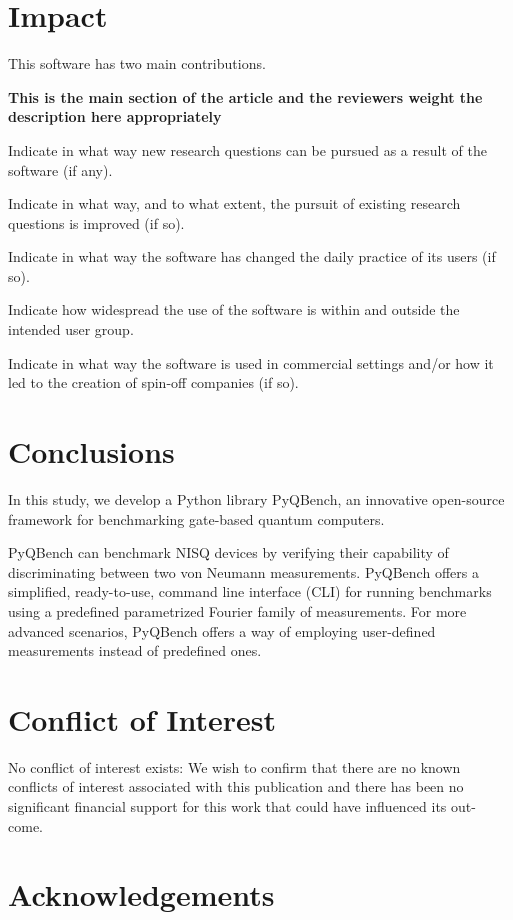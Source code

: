 \documentclass[preprint,12pt, a4paper, dvipsnames]{elsarticle}
\newcommand{\1}{{\rm 1\hspace{-0.9mm}l}}
\begin{document}
\section{Impact}
This software has two main contributions.



\textbf{This is the main section of the article and the reviewers weight the
description here appropriately}

Indicate in what way new research questions can be pursued as a result of the
software (if any).

Indicate in what way, and to what extent, the pursuit of existing research
questions is improved (if so).

Indicate in what way the software has changed the daily practice of its users
(if so).

Indicate how widespread the use of the software is within and outside the
intended user group.

Indicate in what way the software is used in commercial settings and/or how it
led to the creation of spin-off companies (if so).

\section{Conclusions}
\label{}

In this study, we develop  a Python library PyQBench, an innovative open-source framework for benchmarking
gate-based quantum computers.


PyQBench can benchmark NISQ devices by verifying their capability of
discriminating between two von Neumann measurements. PyQBench offers a simplified, ready-to-use,
command line interface (CLI) for running benchmarks using a predefined parametrized Fourier
family of measurements. For more advanced scenarios, PyQBench offers a way of employing user-defined
measurements instead of predefined ones.
\section{Conflict of Interest}
No conflict of interest exists: We wish to confirm that there are no known
conflicts of interest associated with this publication and there has been no
significant financial support for this work that could have influenced its out-
come.


\section*{Acknowledgements}
\end{document}
